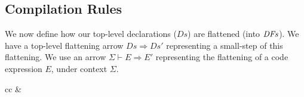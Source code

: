 \subsection{Compilation Rules}
We now define how our top-level declarations ($Ds$) are flattened (into $\mathit{DFs}$). We have a top-level flattening arrow $Ds \Rightarrow Ds'$ representing a small-step of this flattening. We use an arrow $\Sigma\vdash E\Rightarrow E'$ representing the flattening of a code expression $E$, under context $\Sigma$.

\begin{irules}

	\iruleSep
	\begin{array}{cc}
		&
	\\\\
	\\\\
	\end{array}
\end{irules}

